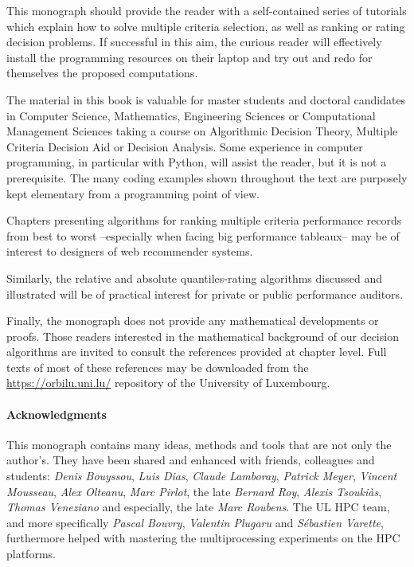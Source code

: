 
This monograph should provide the reader with a self-contained series of tutorials which explain how to solve multiple criteria selection, as well as ranking or rating decision problems. If successful in this aim, the curious reader will effectively install the \Digraph programming resources on their laptop and try out and redo for themselves the proposed computations.


The material in this book is valuable for master students and doctoral candidates in Computer Science, Mathematics, Engineering Sciences or Computational Management Sciences taking a course on Algorithmic Decision Theory, Multiple Criteria Decision Aid or Decision Analysis. Some experience in computer programming, in particular with Python, will assist the reader, but it is not a prerequisite. The many coding examples shown throughout the text are purposely kept elementary from a programming point of view. 

Chapters presenting algorithms for ranking multiple criteria performance records from best to worst --especially when facing big performance tableaux-- may be of interest to designers of web recommender systems. 

Similarly, the relative and absolute quantiles-rating algorithms discussed and illustrated will be of practical interest for private or public performance auditors.

Finally, the monograph does not provide any mathematical developments or proofs. Those readers interested in the mathematical background of our decision algorithms are invited to consult the references provided at chapter level. Full texts of most of these references may be downloaded from the \href{https://orbilu.uni.lu/}{https://orbilu.uni.lu/} repository of the University of Luxembourg. 

\pagebreak

\paragraph{Acknowledgments}

This monograph contains many ideas, methods and tools that are not only the author’s. They have been shared and enhanced with friends, colleagues and students: \emph{Denis Bouyssou}, \emph{Luis Dias},
\emph{Claude Lamboray}, \emph{Patrick Meyer}, \emph{Vincent Mousseau}, \emph{Alex Olteanu}, \emph{Marc Pirlot}, the late \emph{Bernard Roy}, \emph{Alexis Tsouki\`as}, \emph{Thomas Veneziano} and especially, the late \emph{Marc Roubens}. The UL HPC team, and more specifically \emph{Pascal Bouvry}, \emph{Valentin Plugaru} and \emph{Sébastien Varette}, furthermore helped with mastering the multiprocessing experiments on the HPC platforms. 

